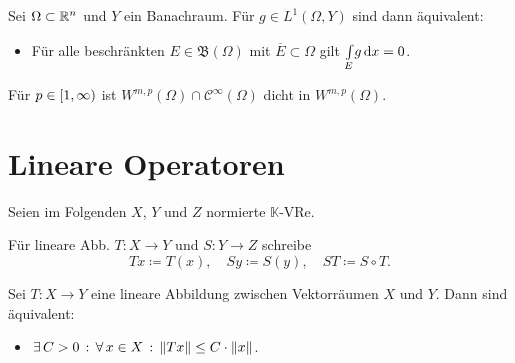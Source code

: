 \documentclass{cheat-sheet}
\newcommand{\K}{\mathbb{K}}
\newcommand{\Bor}{\mathfrak{B}} %
\begin{document}
\begin{samepage}

\begin{satz}
  Sei $\Omega \subset \mathbb{R}^n$ und $Y$ ein Banachraum. Für $g \in L^1(\Omega, Y)$ sind dann äquivalent:
  \begin{itemize}
    \item Für alle beschränkten $E \in \Bor(\Omega)$ mit $\overline{E} \subset \Omega$ gilt ${\textstyle \int\limits_{E}^{}} g \,\mathrm{d} x = 0$.
  \end{itemize}
\end{satz}

\begin{lem}
  Für $p \in \left[ 1, \infty \right)$ ist $W^{m,p}(\Omega) \cap \mathcal{C}^\infty(\Omega)$ dicht in $W^{m,p}(\Omega)$.
\end{lem}

\section{Lineare Operatoren}

\end{samepage}

\begin{nota}
  Seien im Folgenden $X$, $Y$ und $Z$ normierte $\K$-VRe.
\end{nota}

\begin{nota}
  Für lineare Abb. $T : X \to Y$ und $S : Y \to Z$ schreibe
  \[ Tx \coloneqq T(x), \quad Sy \coloneqq S(y), \quad ST \coloneqq S \circ T. \]
\end{nota}

\begin{satz}
  Sei $T : X \to Y$ eine lineare Abbildung zwischen Vektorräumen $X$ und $Y$. Dann sind äquivalent:
  \begin{itemize}
    \item $\exists \, {C > 0} \,:\, \forall \, {x \in X} \,:\, \lVert Tx\rVert \leq C \cdot \lVert x\rVert$.
  \end{itemize}
  \vspace{-8pt}
  \begin{itemize}
  \end{itemize}
\end{satz}
\end{document}
